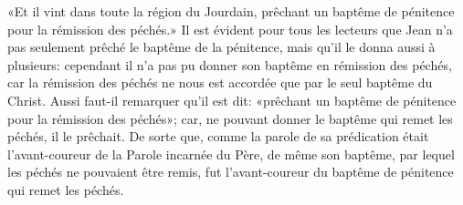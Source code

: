 «Et il vint dans toute la région du Jourdain,
	prêchant un baptême de pénitence pour la rémission des péchés.»
Il est évident pour tous les lecteurs
	que Jean n’a pas seulement prêché le baptême de la pénitence,
	mais qu’il le donna aussi à plusieurs:
	cependant il n’a pas pu donner son baptême en rémission des péchés,
	car la rémission des péchés
		ne nous est accordée que par le seul baptême du Christ.
Aussi faut-il remarquer qu’il est dit:
	«prêchant un baptême de pénitence pour la rémission des péchés»;
	car, ne pouvant donner le baptême qui remet les péchés, il le prêchait.
De sorte que, comme la parole de sa prédication
	était l’avant-coureur de la Parole incarnée du Père,
	de même son baptême, par lequel les péchés ne pouvaient être remis,
	fut l’avant-coureur du baptême de pénitence qui remet les péchés.
